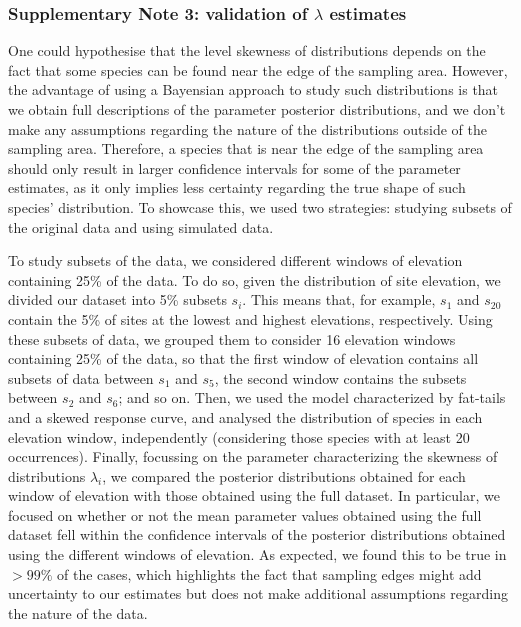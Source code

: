 \documentclass[11pt, a4paper]{article}
\begin{document}
\subsubsection*{Supplementary Note 3: validation of $\lambda$ estimates}

One could hypothesise that the level skewness of distributions depends on the fact that some species can be found near the edge of the sampling area. However, the advantage of using a Bayensian approach to study such distributions is that we obtain full descriptions of the parameter posterior distributions, and we don't make any assumptions regarding the nature of the distributions outside of the sampling area. Therefore, a species that is near the edge of the sampling area should only result in larger confidence intervals for some of the parameter estimates, as it only implies less certainty regarding the true shape of such species' distribution. To showcase this, we used two strategies: studying subsets of the original data and using simulated data.

To study subsets of the data, we considered different windows of elevation containing 25\% of the data. To do so, given the distribution of site elevation, we divided our dataset into 5\% subsets $s_{i}$. This means that, for example, $s_1$ and $s_{20}$ contain the 5\% of sites at the lowest and highest elevations, respectively. Using these subsets of data, we grouped them to consider 16 elevation windows containing 25\% of the data, so that the first window of elevation contains all subsets of data between $s_1$ and $s_5$, the second window contains the subsets between $s_2$ and $s_6$; and so on. Then, we used the model characterized by fat-tails and a skewed response curve, and analysed the distribution of species in each elevation window, independently (considering those species with at least 20 occurrences). Finally, focussing on the parameter characterizing the skewness of distributions $\lambda_i$, we compared the posterior distributions obtained for each window of elevation with those obtained using the full dataset. In particular, we focused on whether or not the mean parameter values obtained using the full dataset fell within the confidence intervals of the posterior distributions obtained using the different windows of elevation. As expected, we found this to be true in $>99\%$ of the cases, which highlights the fact that sampling edges might add uncertainty to our estimates but does not make additional assumptions regarding the nature of the data.
\end{document}
